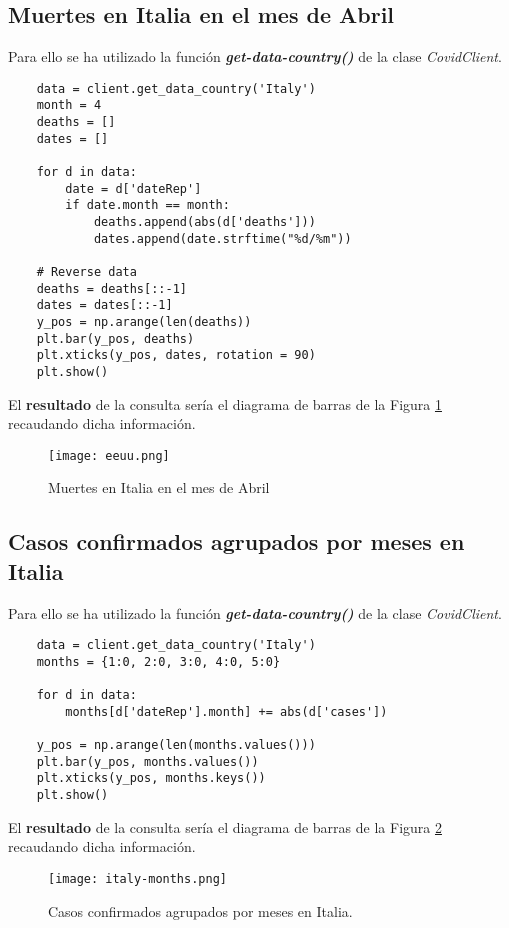 \documentclass[11pt]{diazessay} %
\begin{document}
\subsection*{Muertes en Italia en el mes de Abril}
Para ello se ha utilizado la función \textit{\textbf{get-data-country()}} \cite{jupyter} de la clase \textit{CovidClient}.

\lstset{language=Python}
\begin{lstlisting}
	data = client.get_data_country('Italy')
	month = 4
	deaths = []
	dates = []
	
	for d in data:
		date = d['dateRep']
		if date.month == month:
			deaths.append(abs(d['deaths']))
			dates.append(date.strftime("%d/%m"))
	
	# Reverse data
	deaths = deaths[::-1]
	dates = dates[::-1]
	y_pos = np.arange(len(deaths))
	plt.bar(y_pos, deaths)
	plt.xticks(y_pos, dates, rotation = 90)
	plt.show()
\end{lstlisting}

El \textbf{resultado} de la consulta sería el diagrama de barras de la Figura \ref{fig:eeuu} recaudando dicha información.

\begin{figure}[h!]
	\centering
	\texttt{[image: eeuu.png]}
	\caption{Muertes en Italia en el mes de Abril \cite{matplotlib}}
	\label{fig:eeuu}
\end{figure}


\subsection*{Casos confirmados agrupados por meses en Italia}
Para ello se ha utilizado la función \textit{\textbf{get-data-country()}} \cite{jupyter} de la clase \textit{CovidClient}.

\lstset{language=Python}
\begin{lstlisting}
	data = client.get_data_country('Italy')
	months = {1:0, 2:0, 3:0, 4:0, 5:0}
	
	for d in data:
		months[d['dateRep'].month] += abs(d['cases'])
	
	y_pos = np.arange(len(months.values()))
	plt.bar(y_pos, months.values())
	plt.xticks(y_pos, months.keys())
	plt.show()
\end{lstlisting}

El \textbf{resultado} de la consulta sería el diagrama de barras de la Figura \ref{fig:italy} recaudando dicha información.

\begin{figure}[h!]
	\centering
	\texttt{[image: italy-months.png]}
	\caption{Casos confirmados agrupados por meses en Italia. \cite{matplotlib}}
	\label{fig:italy}
\end{figure}
\end{document}
